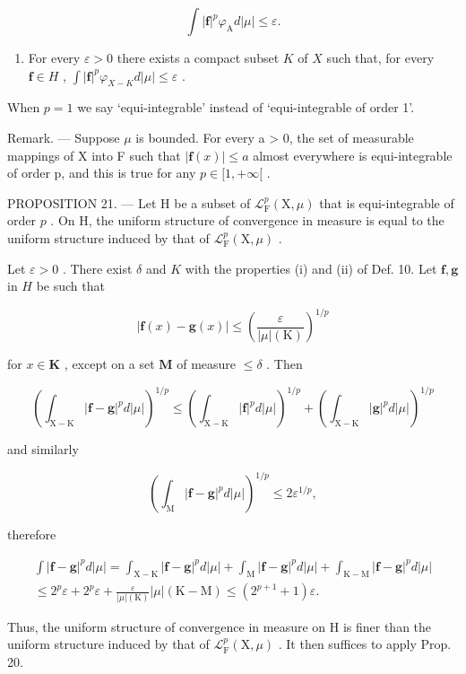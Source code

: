 \[
\int | \mathbf {f} | ^ {p} \varphi_ {\mathrm{A}} d | \mu | \leqslant \varepsilon .
\]

\begin{enumerate}
\def\labelenumi{(\roman{enumi})}
\setcounter{enumi}{1}
\tightlist
\item
  For every \(\varepsilon > 0\) there exists a compact subset \(K\) of \(X\) such that, for every \(\mathbf{f} \in H\) , \(\int |\mathbf{f}|^p \varphi_{X - K} d|\mu| \leqslant \varepsilon\) .
\end{enumerate}

When \(p = 1\) we say `equi-integrable' instead of `equi-integrable of order 1'.

Remark. --- Suppose \(\mu\) is bounded. For every a \textgreater{} 0, the set of measurable mappings of X into F such that \(|\mathbf{f}(x)| \leqslant a\) almost everywhere is equi-integrable of order p, and this is true for any \(p \in [1, +\infty[\) .

PROPOSITION 21. --- Let H be a subset of \(\mathcal{L}_{\mathrm{F}}^{p}(\mathrm{X},\mu)\) that is equi-integrable of order \(p\) . On H, the uniform structure of convergence in measure is equal to the uniform structure induced by that of \(\mathcal{L}_{\mathrm{F}}^{p}(\mathrm{X},\mu)\) .

Let \(\varepsilon > 0\) . There exist \(\delta\) and \(K\) with the properties (i) and (ii) of Def. 10. Let \(\mathbf{f}, \mathbf{g}\) in \(H\) be such that

\[
| \mathbf {f} (x) - \mathbf {g} (x) | \leqslant \left(\frac {\varepsilon}{| \mu | (\mathrm{K})}\right) ^ {1 / p}
\]

for \(x \in \mathbf{K}\) , except on a set \(\mathbf{M}\) of measure \(\leqslant \delta\) . Then

\[
\left(\int_ {\mathrm{X} - \mathrm{K}} | \mathbf {f} - \mathbf {g} | ^ {p} d | \mu |\right) ^ {1 / p} \leqslant \left(\int_ {\mathrm{X} - \mathrm{K}} | \mathbf {f} | ^ {p} d | \mu |\right) ^ {1 / p} + \left(\int_ {\mathrm{X} - \mathrm{K}} | \mathbf {g} | ^ {p} d | \mu |\right) ^ {1 / p}
\]

and similarly

\[
\left(\int_ {\mathrm{M}} | \mathbf {f} - \mathbf {g} | ^ {p} d | \mu |\right) ^ {1 / p} \leqslant 2 \varepsilon^ {1 / p},
\]

therefore

\[
\begin{array}{c} \int | \mathbf {f} - \mathbf {g} | ^ {p} d | \mu | = \int_ {\mathrm{X-K}} | \mathbf {f} - \mathbf {g} | ^ {p} d | \mu | + \int_ {\mathrm{M}} | \mathbf {f} - \mathbf {g} | ^ {p} d | \mu | + \int_ {\mathrm{K-M}} | \mathbf {f} - \mathbf {g} | ^ {p} d | \mu | \\ \leqslant 2 ^ {p} \varepsilon + 2 ^ {p} \varepsilon + \frac {\varepsilon}{| \mu | (\mathrm{K})} | \mu | (\mathrm{K-M}) \leqslant (2 ^ {p + 1} + 1) \varepsilon . \end{array}
\]

Thus, the uniform structure of convergence in measure on H is finer than the uniform structure induced by that of \(\mathcal{L}_{\mathrm{F}}^{p}(\mathrm{X},\mu)\) . It then suffices to apply Prop. 20.

